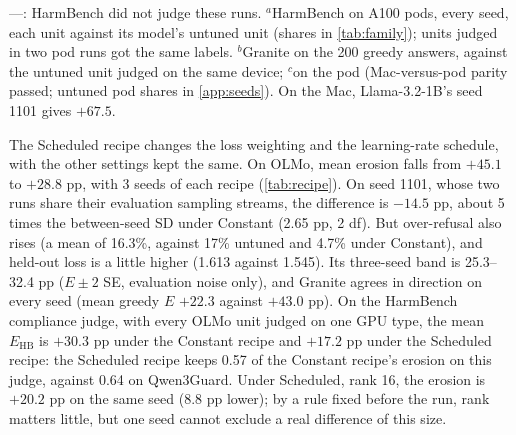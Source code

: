 \documentclass{article}
\newcommand{\Ehb}{E_{\mathrm{HB}}}
\begin{document}
\begin{table}[t]
  \smallskip
  \parbox{\textwidth}{\footnotesize\raggedright
    ---: HarmBench did not judge these runs.
    $^{a}$HarmBench on A100 pods, every seed, each unit against its model's
    untuned unit (shares in \cref{tab:family}); units judged in two pod runs
    got the same labels.
    $^{b}$Granite on the 200 greedy answers, against the untuned unit judged on
    the same device; $^{c}$on the pod (Mac-versus-pod parity passed; untuned
    pod shares in \cref{app:seeds}). On the Mac, Llama-3.2-1B's seed 1101
    gives $+67.5$.}
\end{table}

The Scheduled recipe changes the loss weighting and the learning-rate
schedule, with the other settings kept the same. On OLMo, mean erosion falls
from $+45.1$ to $+28.8$ pp, with 3 seeds of each recipe (\cref{tab:recipe}).
On seed 1101, whose two runs share their evaluation sampling streams, the
difference is $-14.5$ pp, about 5 times the between-seed SD under Constant
(2.65 pp, 2 df). But over-refusal also rises (a mean of 16.3\%, against
17\% untuned and 4.7\% under Constant), and held-out loss is a little higher
(1.613 against 1.545).
Its three-seed band is 25.3--32.4 pp ($E \pm 2$ SE, evaluation noise only), and
Granite agrees in direction on every seed (mean greedy $E$ $+22.3$ against
$+43.0$ pp). On the HarmBench compliance judge, with every OLMo unit judged on
one GPU type, the mean $\Ehb$ is $+30.3$ pp under the Constant recipe and
$+17.2$ pp under the Scheduled recipe: the Scheduled recipe keeps 0.57 of the
Constant recipe's erosion on this judge, against 0.64 on Qwen3Guard. Under
Scheduled, rank 16, the erosion is $+20.2$ pp on the same seed (8.8 pp lower);
by a rule fixed before the run, rank matters little, but one seed cannot
exclude a real difference of this size.
\end{document}
